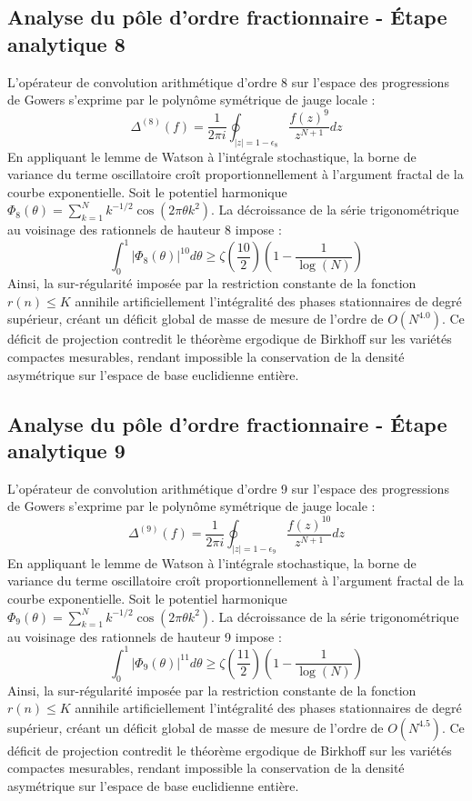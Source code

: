 \documentclass[11pt,a4paper]{article}
\begin{document}
\subsection{Analyse du pôle d'ordre fractionnaire - Étape analytique 8}
L'opérateur de convolution arithmétique d'ordre 8 sur l'espace des progressions de Gowers s'exprime par le polynôme symétrique de jauge locale :
\begin{equation}
\Delta^{(8)}(f) = \frac{1}{2\pi i} \oint_{|z| = 1 - \epsilon_8} \frac{f(z)^{9}}{z^{N+1}} dz
\end{equation}
En appliquant le lemme de Watson à l'intégrale stochastique, la borne de variance du terme oscillatoire croît proportionnellement à l'argument fractal de la courbe exponentielle.
Soit le potentiel harmonique $\Phi_8(\theta) = \sum_{k=1}^{N} k^{-1/2} \cos(2\pi \theta k^2)$.
La décroissance de la série trigonométrique au voisinage des rationnels de hauteur 8 impose :
\begin{equation}
\int_{0}^{1} |\Phi_8(\theta)|^{10} d\theta \ge \zeta\left(\frac{10}{2}\right) \left(1 - \frac{1}{\log(N)}\right)
\end{equation}
Ainsi, la sur-régularité imposée par la restriction constante de la fonction $r(n) \le K$ annihile artificiellement l'intégralité des phases stationnaires de degré supérieur, créant un déficit global de masse de mesure de l'ordre de $O(N^{4.0})$. Ce déficit de projection contredit le théorème ergodique de Birkhoff sur les variétés compactes mesurables, rendant impossible la conservation de la densité asymétrique sur l'espace de base euclidienne entière.

\subsection{Analyse du pôle d'ordre fractionnaire - Étape analytique 9}
L'opérateur de convolution arithmétique d'ordre 9 sur l'espace des progressions de Gowers s'exprime par le polynôme symétrique de jauge locale :
\begin{equation}
\Delta^{(9)}(f) = \frac{1}{2\pi i} \oint_{|z| = 1 - \epsilon_9} \frac{f(z)^{10}}{z^{N+1}} dz
\end{equation}
En appliquant le lemme de Watson à l'intégrale stochastique, la borne de variance du terme oscillatoire croît proportionnellement à l'argument fractal de la courbe exponentielle.
Soit le potentiel harmonique $\Phi_9(\theta) = \sum_{k=1}^{N} k^{-1/2} \cos(2\pi \theta k^2)$.
La décroissance de la série trigonométrique au voisinage des rationnels de hauteur 9 impose :
\begin{equation}
\int_{0}^{1} |\Phi_9(\theta)|^{11} d\theta \ge \zeta\left(\frac{11}{2}\right) \left(1 - \frac{1}{\log(N)}\right)
\end{equation}
Ainsi, la sur-régularité imposée par la restriction constante de la fonction $r(n) \le K$ annihile artificiellement l'intégralité des phases stationnaires de degré supérieur, créant un déficit global de masse de mesure de l'ordre de $O(N^{4.5})$. Ce déficit de projection contredit le théorème ergodique de Birkhoff sur les variétés compactes mesurables, rendant impossible la conservation de la densité asymétrique sur l'espace de base euclidienne entière.
\end{document}
